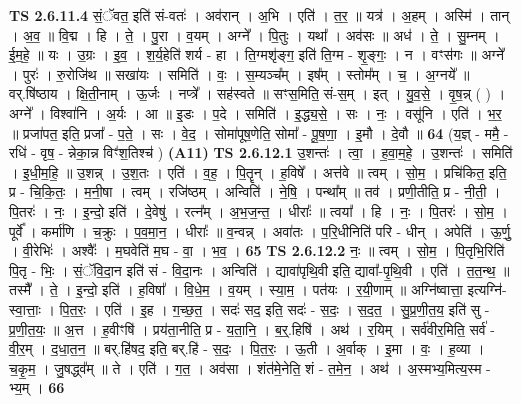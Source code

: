 \documentclass[17pt]{extarticle}
\begin{document}
                  \newline
                                \textbf{ TS 2.6.11.4} \newline
                  सं॒ॅवत॒ इति॑ सं-वतः॑ । अव॑रान् । अ॒भि । एति॑ । त॒र॒ ॥ यत्र॑ । अ॒हम् । अस्मि॑ । तान् । अ॒व॒ ॥ वि॒द्म । हि । ते॒ । पु॒रा । व॒यम् । अग्ने᳚ । पि॒तुः । यथा᳚ । अव॑सः ॥ अध॑ । ते॒ । सु॒म्नम् । ई॒म॒हे॒ ॥ यः । उ॒ग्रः । इ॒व॒ । श॒र्य॒हेति॑ शर्य - हा । ति॒ग्मशृ॑ङ्ग॒ इति॑ ति॒ग्म - शृ॒ङ्गः॒ । न । वꣳस॑गः ॥ अग्ने᳚ । पुरः॑ । रु॒रोजि॑थ ॥ सखा॑यः । समिति॑ । वः॒ । स॒म्यञ्च᳚म् । इष᳚म् । स्तोम᳚म् । च॒ । अ॒ग्नये᳚ ॥ वर्.षि॑ष्ठाय । क्षि॒ती॒नाम् । ऊ॒र्जः । नप्त्रे᳚ । सह॑स्वते ॥ सꣳस॒मिति॒ सं-स॒म् । इत् । यु॒व॒से॒ । वृ॒ष॒न्न् ( ) । अग्ने᳚ । विश्वा॑नि । अ॒र्यः । आ ॥ इ॒डः । प॒दे । समिति॑ । इ॒द्ध्य॒से॒ । सः । नः॒ । वसू॑नि । एति॑ । भ॒र॒ ॥ प्रजा॑पत॒ इति॒ प्रजा᳚ - प॒ते॒ । सः । वे॒द॒ । सोमा॑पूष॒णेति॒ सोमा᳚ - पू॒ष॒णा॒ । इ॒मौ । दे॒वौ ॥ \textbf{  64} \newline
                  \newline
                      (य॒ज्ञ् - ममै॒ - रधि॑ - वृष॒ - न्नेका॒न्न विꣳ॑श॒तिश्च॑ )  \textbf{(A11)} \newline \newline
                                \textbf{ TS 2.6.12.1} \newline
                  उ॒शन्तः॑ । त्वा॒ । ह॒वा॒म॒हे॒ । उ॒शन्तः॑ । समिति॑ । इ॒धी॒म॒हि॒ ॥ उ॒शन्न् । उ॒श॒तः । एति॑ । व॒ह॒ । पि॒तॄन् । ह॒विषे᳚ । अत्त॑वे ॥ त्वम् । सो॒म॒ । प्रचि॑कित॒ इति॒ प्र - चि॒कि॒तः॒ । म॒नी॒षा । त्वम् । रजि॑ष्ठम् । अन्विति॑ । ने॒षि॒ । पन्था᳚म् ॥ तव॑ । प्रणी॒तीति॒ प्र - नी॒ती॒ । पि॒तरः॑ । नः॒ । इ॒न्दो॒ इति॑ । दे॒वेषु॑ । रत्न᳚म् । अ॒भ॒ज॒न्त॒ । धीराः᳚ ॥ त्वया᳚ । हि । नः॒ । पि॒तरः॑ । सो॒म॒ । पूर्वे᳚ । कर्मा॑णि । च॒क्रुः । प॒व॒मा॒न॒ । धीराः᳚ ॥ व॒न्वन्न् । अवा॑तः । प॒रि॒धीनिति॑ परि - धीन् । अपेति॑ । ऊ॒र्णु॒ । वी॒रेभिः॑ । अश्वैः᳚ । म॒घवेति॑ म॒घ - वा॒ । भ॒व॒ । \textbf{  65} \newline
                  \newline
                                \textbf{ TS 2.6.12.2} \newline
                  नः॒ ॥ त्वम् । सो॒म॒ । पि॒तृभि॒रिति॑ पि॒तृ - भिः॒ । सं॒ॅवि॒दा॒न इति॑ सं - वि॒दा॒नः । अन्विति॑ । द्यावा॑पृथि॒वी इति॒ द्यावा᳚-पृ॒थि॒वी । एति॑ । त॒त॒न्थ॒ ॥ तस्मै᳚ । ते॒ । इ॒न्दो॒ इति॑ । ह॒विषा᳚ । वि॒धे॒म॒ । व॒यम् । स्या॒म॒ । पत॑यः । र॒यी॒णाम् ॥ अग्नि॑ष्वात्ता॒ इत्यग्नि॑- स्वा॒त्ताः॒ । पि॒त॒रः॒ । एति॑ । इ॒ह । ग॒च्छ॒त॒ । सदः॑ सद॒ इति॒ सदः॑ - स॒दः॒ । स॒द॒त॒ । सु॒प्र॒णी॒त॒य॒ इति॑ सु - प्र॒णी॒त॒यः॒ ॥ अ॒त्त । ह॒वीꣳषि॑ । प्रय॑ता॒नीति॒ प्र - य॒ता॒नि॒ । ब॒र्॒.हिषि॑ । अथ॑ । र॒यिम् । सर्व॑वीर॒मिति॒ सर्व॑ - वी॒र॒म् । द॒धा॒त॒न॒ ॥ बर्.हि॑षद॒ इति॒ बर्.हि॑ - स॒दः॒ । पि॒त॒रः॒ । ऊ॒ती । अ॒र्वाक् । इ॒मा । वः॒ । ह॒व्या । च॒कृ॒म॒ । जु॒षद्ध्व᳚म् ॥ ते । एति॑ । ग॒त॒ । अव॑सा । शंत॑मे॒नेति॒ शं - त॒मे॒न॒ । अथ॑ । अ॒स्मभ्य॒मित्य॒स्म - भ्य॒म् । \textbf{  66} \newline
\end{document}
